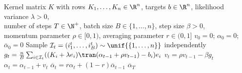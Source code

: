 \begin{algorithmic}[1]
    \Require Kernel matrix $K$ with rows $K_1,\dots,K_n\in \R^n$, targets $b \in \R^n$, 
    likelihood variance $\lambda > 0$, \\
    number of steps $T \in \N^+$, 
    batch size $B \in \{1, \dotsc, n\}$, 
    step size $\beta > 0$, \\
    momentum parameter $\rho \in [0,1)$, 
    averaging parameter $r \in (0,1]$
    \State $v_0 = 0$; $\alpha_0 = 0$; $\overline \alpha_0 = 0$ 
        \State Sample $\mathcal{I}_t = (i^t_1, \dotsc, i^t_B) \sim \unif{\{1,\dotsc, n\}}$ independently 
        \State $g_t = \frac{n}{B} \sum_{i \in \mathcal{I}_t} (\smash{( K_i + \lambda e_i)\tran (\alpha_{t-1} + \rho v_{t-1})} - b_i)e_i$ 
        \State $v_t = \rho v_{t-1} - \beta g_t$ 
        \State $\alpha_t = \alpha_{t-1} + v_t$ 
        \State $\overline\alpha_{t} = r\alpha_t + (1-r)\overline\alpha_{t-1}$ 
    \EndFor
    \State \Return $\overline\alpha_T$
\end{algorithmic}
